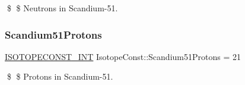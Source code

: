 \$ \$ Neutrons in Scandium-\/51. \mbox{\label{group___isotope_const-_scandium-_sc51_ga1967a10c240b39249a38944c8abe0148}} 
\subsubsection{\texorpdfstring{Scandium51\+Protons}{Scandium51Protons}}
{\footnotesize\ttfamily \mbox{\hyperlink{group___isotope_const-_macros_ga5f18360b3e99483a35c32d789e62621c}{I\+S\+O\+T\+O\+P\+E\+C\+O\+N\+S\+T\+\_\+\+I\+NT}} Isotope\+Const\+::\+Scandium51\+Protons = 21}

\$ \$ Protons in Scandium-\/51. 